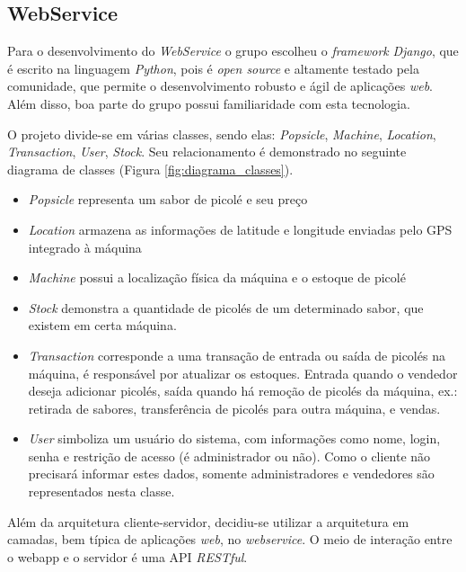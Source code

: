 \subsection{WebService}
Para o desenvolvimento do \textit{WebService} o grupo escolheu o \textit{framework} \textit{Django}, que é escrito na linguagem \textit{Python}, pois é \textit{open source} e altamente testado pela comunidade, que permite o desenvolvimento robusto e ágil de aplicações \textit{web}. Além disso, boa parte do grupo possui familiaridade com esta tecnologia.

O projeto divide-se em várias classes, sendo elas: \textit{Popsicle}, \textit{Machine}, \textit{Location}, \textit{Transaction}, \textit{User}, \textit{Stock}. Seu relacionamento é demonstrado no seguinte diagrama de classes (Figura \ref{fig:diagrama_classes}).

\begin{itemize}
\item \textit{Popsicle} representa um sabor de picolé e seu preço
\item \textit{Location} armazena as informações de latitude e longitude enviadas pelo GPS integrado à máquina
\item \textit{Machine} possui a localização física da máquina e o estoque de picolé
\item \textit{Stock} demonstra a quantidade de picolés de um determinado sabor, que existem em certa máquina.
\item \textit{Transaction} corresponde a uma transação de entrada ou saída de picolés na máquina, é responsável por atualizar os estoques. Entrada quando o vendedor deseja adicionar picolés, saída quando há remoção de picolés da máquina, ex.: retirada de sabores, transferência de picolés para outra máquina, e vendas.
\item \textit{User} simboliza um usuário do sistema, com informações como nome, login, senha e restrição de acesso (é administrador ou não). Como o cliente não precisará informar estes dados, somente administradores e vendedores são representados nesta classe.
\end{itemize}

Além da arquitetura cliente-servidor, decidiu-se utilizar a arquitetura em camadas, bem típica de aplicações \textit{web}, no \textit{webservice}. O meio de interação entre o webapp e o servidor é uma API \textit{RESTful}.

